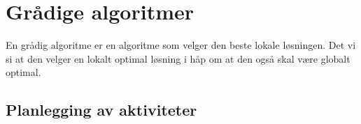 \section{Grådige algoritmer}
En grådig algoritme er en algoritme som velger den beste lokale løsningen. Det vi si at den velger en lokalt optimal løsning i håp om at den også skal være globalt optimal.

\subsection{Planlegging av aktiviteter}